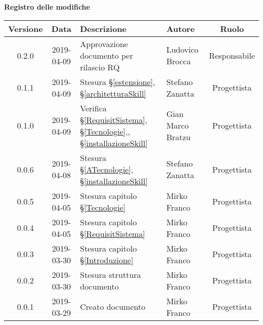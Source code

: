 	\begin{center}
		\textbf{Registro delle modifiche}
	\end{center}
	\begin{center}
		\begin{tabularx}{\textwidth}{|c|c|X|X|c|}
			\hline
			\textbf{Versione} & \textbf{Data} & \textbf{Descrizione} & \textbf{Autore} & \textbf{Ruolo} \\
			\hline
			0.2.0 & 2019-04-09 & Approvazione documento per rilascio RQ & Ludovico Brocca & Responsabile \\		
			\hline
			0.1.1 & 2019-04-09 & Stesura \S\ref{estensione}, \S\ref{architetturaSkill} & Stefano Zanatta & Progettista \\
			\hline
			0.1.0 & 2019-04-09 & Verifica \S\ref{RequisitSistema}, \S\ref{Tecnologie},, \S\ref{installazioneSkill} & Gian Marco Bratzu & Progettista \\
			\hline
			0.0.6 & 2019-04-08 & Stesura \S\ref{ATecnologie}, \S\ref{installazioneSkill} & Stefano Zanatta & Progettista \\
			\hline
			0.0.5 & 2019-04-05 & Stesura capitolo \S\ref{Tecnologie} & Mirko Franco & Progettista \\
			\hline
			0.0.4 & 2019-04-05 & Stesura capitolo \S\ref{RequisitSistema} & Mirko Franco & Progettista \\
			\hline
			0.0.3 & 2019-03-30 & Stesura capitolo \S\ref{Introduzione} & Mirko Franco & Progettista \\
			\hline
			0.0.2 & 2019-03-30 & Stesura struttura documento & Mirko Franco & Progettista \\
			\hline
			0.0.1 & 2019-03-29 & Creato documento & Mirko Franco & Progettista \\
			\hline
		\end{tabularx}
	\end{center}
\newpage